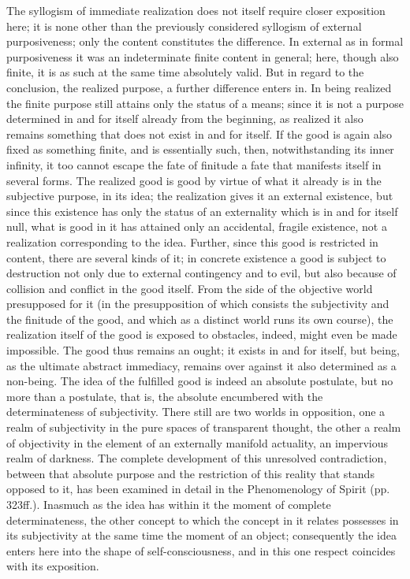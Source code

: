The syllogism of immediate realization
does not itself require closer exposition here;
it is none other than the previously considered syllogism
of external purposiveness;
only the content constitutes the difference.
In external as in formal purposiveness
it was an indeterminate finite content in general;
here, though also finite,
it is as such at the same time absolutely valid.
But in regard to the conclusion, the realized purpose,
a further difference enters in.
In being realized the finite purpose still attains
only the status of a means;
since it is not a purpose determined in and for itself
already from the beginning,
as realized it also remains something that does not
exist in and for itself.
If the good is again also fixed as something finite,
and is essentially such, then,
notwithstanding its inner infinity,
it too cannot escape the fate of finitude
a fate that manifests itself in several forms.
The realized good is good by virtue of what
it already is in the subjective purpose, in its idea;
the realization gives it an external existence,
but since this existence has only the status of
an externality which is in and for itself null,
what is good in it has attained only
an accidental, fragile existence,
not a realization corresponding to the idea.
Further, since this good is restricted in content,
there are several kinds of it;
in concrete existence a good is subject to
destruction not only due to external contingency and to evil,
but also because of collision and conflict in the good itself.
From the side of the objective world presupposed for it
(in the presupposition of which consists
the subjectivity and the finitude of the good,
and which as a distinct world runs its own course),
the realization itself of the good
is exposed to obstacles, indeed,
might even be made impossible.
The good thus remains an ought;
it exists in and for itself,
but being, as the ultimate abstract immediacy,
remains over against it also determined as a non-being.
The idea of the fulfilled good is
indeed an absolute postulate,
but no more than a postulate, that is,
the absolute encumbered with
the determinateness of subjectivity.
There still are two worlds in opposition,
one a realm of subjectivity in
the pure spaces of transparent thought,
the other a realm of objectivity in
the element of an externally manifold actuality,
an impervious realm of darkness.
The complete development of this unresolved contradiction,
between that absolute purpose
and the restriction of this reality
that stands opposed to it,
has been examined in detail in
the Phenomenology of Spirit (pp. 323ff.).
Inasmuch as the idea has within it
the moment of complete determinateness,
the other concept to which the concept in
it relates possesses in its subjectivity
at the same time the moment of an object;
consequently the idea enters here into
the shape of self-consciousness,
and in this one respect
coincides with its exposition.

